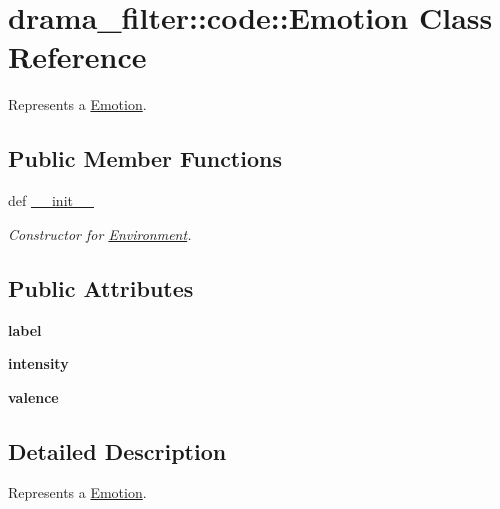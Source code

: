 \hypertarget{classdrama__filter_1_1code_1_1Emotion}{
\section{drama\_\-filter::code::Emotion Class Reference}
\label{classdrama__filter_1_1code_1_1Emotion}
}


Represents a \hyperlink{classdrama__filter_1_1code_1_1Emotion}{Emotion}.  


\subsection*{Public Member Functions}
\begin{DoxyCompactItemize}
\item 
def \hyperlink{classdrama__filter_1_1code_1_1Emotion_ae0d9aa805be0c761b3ecd79be4ec32fe}{\_\-\_\-init\_\-\_\-}
\begin{DoxyCompactList}\small\item\em Constructor for \hyperlink{classdrama__filter_1_1code_1_1Environment}{Environment}. \end{DoxyCompactList}\end{DoxyCompactItemize}
\subsection*{Public Attributes}
\begin{DoxyCompactItemize}
\item 
\hypertarget{classdrama__filter_1_1code_1_1Emotion_aaf6007493c39739f42c4d0ce10a92cf0}{
{\bfseries label}}
\label{classdrama__filter_1_1code_1_1Emotion_aaf6007493c39739f42c4d0ce10a92cf0}

\item 
\hypertarget{classdrama__filter_1_1code_1_1Emotion_ad379f8d715273c8e7bcca4811f02dfbe}{
{\bfseries intensity}}
\label{classdrama__filter_1_1code_1_1Emotion_ad379f8d715273c8e7bcca4811f02dfbe}

\item 
\hypertarget{classdrama__filter_1_1code_1_1Emotion_a6844405e4ad5017a6be8e37399e85efa}{
{\bfseries valence}}
\label{classdrama__filter_1_1code_1_1Emotion_a6844405e4ad5017a6be8e37399e85efa}

\end{DoxyCompactItemize}


\subsection{Detailed Description}
Represents a \hyperlink{classdrama__filter_1_1code_1_1Emotion}{Emotion}. 

